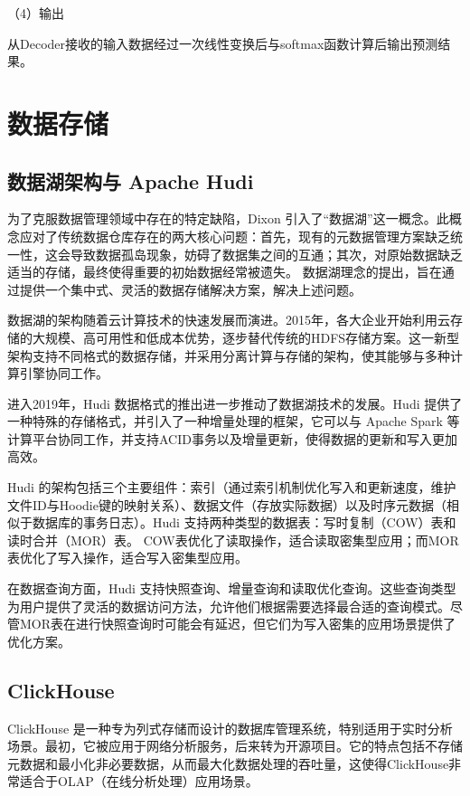 （4）输出

从Decoder接收的输入数据经过一次线性变换后与softmax函数计算后输出预测结果。

\section{数据存储}
\subsection{数据湖架构与 Apache Hudi}
为了克服数据管理领域中存在的特定缺陷，Dixon 引入了“数据湖”这一概念\cite{sawadogo2021data}。此概念应对了传统数据仓库存在的两大核心问题：首先，现有的元数据管理方案缺乏统一性，这会导致数据孤岛现象，妨碍了数据集之间的互通；其次，对原始数据缺乏适当的存储，最终使得重要的初始数据经常被遗失。
数据湖理念的提出，旨在通过提供一个集中式、灵活的数据存储解决方案，解决上述问题。

数据湖的架构随着云计算技术的快速发展而演进。2015年，各大企业开始利用云存储的大规模、高可用性和低成本优势，逐步替代传统的HDFS存储方案。这一新型架构支持不同格式的数据存储，并采用分离计算与存储的架构，使其能够与多种计算引擎协同工作。

进入2019年，Hudi 数据格式\cite{Hudi}的推出进一步推动了数据湖技术的发展。Hudi 提供了一种特殊的存储格式，并引入了一种增量处理的框架，它可以与 Apache Spark 等计算平台协同工作，并支持ACID事务以及增量更新\cite{gebretsadkan2019hudi}，使得数据的更新和写入更加高效。

Hudi 的架构包括三个主要组件：索引（通过索引机制优化写入和更新速度，维护文件ID与Hoodie键的映射关系）、数据文件（存放实际数据）以及时序元数据（相似于数据库的事务日志）。Hudi 支持两种类型的数据表：写时复制（COW）表和读时合并（MOR）表\cite{belov2021analysis}。
COW表优化了读取操作，适合读取密集型应用；而MOR表优化了写入操作，适合写入密集型应用。

在数据查询方面，Hudi 支持快照查询、增量查询和读取优化查询。这些查询类型为用户提供了灵活的数据访问方法，允许他们根据需要选择最合适的查询模式。尽管MOR表在进行快照查询时可能会有延迟，但它们为写入密集的应用场景提供了优化方案。
\subsection{ClickHouse}
ClickHouse 是一种专为列式存储而设计的数据库管理系统，特别适用于实时分析场景。最初，它被应用于网络分析服务，后来转为开源项目。它的特点包括不存储元数据和最小化非必要数据，从而最大化数据处理的吞吐量，这使得ClickHouse非常适合于OLAP（在线分析处理）应用场景\cite{goranssonevaluating}。

